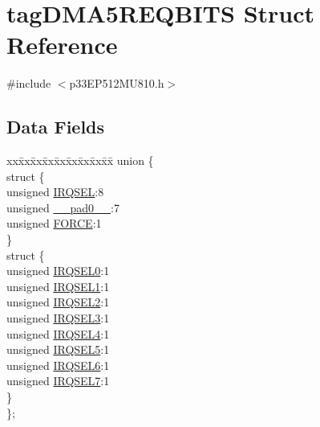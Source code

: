 \hypertarget{structtag_d_m_a5_r_e_q_b_i_t_s}{}\section{tag\+D\+M\+A5\+R\+E\+Q\+B\+I\+TS Struct Reference}
\label{structtag_d_m_a5_r_e_q_b_i_t_s}


{\ttfamily \#include $<$p33\+E\+P512\+M\+U810.\+h$>$}

\subsection*{Data Fields}
\begin{DoxyCompactItemize}
\item 
\begin{tabbing}
xx\=xx\=xx\=xx\=xx\=xx\=xx\=xx\=xx\=\kill
union \{\\
\>struct \{\\
\>\>unsigned \hyperlink{structtag_d_m_a5_r_e_q_b_i_t_s_a5e70ba01366ab2f37371d52661dd93b2}{IRQSEL}:8\\
\>\>unsigned \hyperlink{structtag_d_m_a5_r_e_q_b_i_t_s_adf71f3d8410c1f1dbbc96680a92c49af}{\_\_pad0\_\_}:7\\
\>\>unsigned \hyperlink{structtag_d_m_a5_r_e_q_b_i_t_s_a9b378a7ffc1ab4bc4a3710fb36389180}{FORCE}:1\\
\>\} \\
\>struct \{\\
\>\>unsigned \hyperlink{structtag_d_m_a5_r_e_q_b_i_t_s_ac73241b8f783760c9192dfd8a0773cad}{IRQSEL0}:1\\
\>\>unsigned \hyperlink{structtag_d_m_a5_r_e_q_b_i_t_s_a45e1f083e5a8a59f25acc35910732426}{IRQSEL1}:1\\
\>\>unsigned \hyperlink{structtag_d_m_a5_r_e_q_b_i_t_s_a60dda7474727b3624ca25fa0067a8924}{IRQSEL2}:1\\
\>\>unsigned \hyperlink{structtag_d_m_a5_r_e_q_b_i_t_s_aeaafe1b8c89398ed382054ab628aed78}{IRQSEL3}:1\\
\>\>unsigned \hyperlink{structtag_d_m_a5_r_e_q_b_i_t_s_a91c4162e0f3d4ac7adcdb49302f19840}{IRQSEL4}:1\\
\>\>unsigned \hyperlink{structtag_d_m_a5_r_e_q_b_i_t_s_a6382d50430464cf20b3dee3dbf2e8c01}{IRQSEL5}:1\\
\>\>unsigned \hyperlink{structtag_d_m_a5_r_e_q_b_i_t_s_ace52408ef8c29561f3c56a3fbcbc8217}{IRQSEL6}:1\\
\>\>unsigned \hyperlink{structtag_d_m_a5_r_e_q_b_i_t_s_acce7dedecdf1f53cdbead3edf7c5d53a}{IRQSEL7}:1\\
\>\} \\
\}; \\

\end{tabbing}\end{DoxyCompactItemize}


